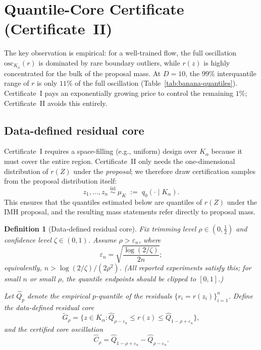 \documentclass[12pt]{article}
\newtheorem{definition}[theorem]{Definition}
\newcommand{\osc}{\mathrm{osc}}
\begin{document}
\section{Quantile-Core Certificate (Certificate~II)}\label{sec:quantile}

The key observation is empirical: for a well-trained flow, the full oscillation $\osc_{K_\alpha}(r)$ is dominated by rare boundary outliers, while $r(z)$ is highly concentrated for the bulk of the proposal mass.
At $D = 10$, the $99\%$ interquantile range of $r$ is only $11\%$ of the full oscillation (Table~\ref{tab:banana-quantiles}).
Certificate~I pays an exponentially growing price to control the remaining $1\%$; Certificate~II avoids this entirely.

\subsection{Data-defined residual core}

Certificate~I requires a space-filling (e.g., uniform) design over $K_\alpha$ because it must cover the entire region.
Certificate~II only needs the one-dimensional distribution of $r(Z)$ under the \emph{proposal}; we therefore draw certification samples from the proposal distribution itself:
\begin{equation}\label{eq:cert-sampling}
  z_1, \dots, z_n \;\overset{\mathrm{iid}}{\sim}\; \mu_K \;:=\; q_0(\cdot \mid K_\alpha).
\end{equation}
This ensures that the quantiles estimated below are quantiles of $r(Z)$ under the IMH proposal, and the resulting mass statements refer directly to proposal mass.

\begin{definition}[Data-defined residual core]\label{def:core}
Fix trimming level $\rho \in (0, \tfrac{1}{2})$ and confidence level $\zeta \in (0,1)$.
Assume $\rho > \varepsilon_n$, where
\begin{equation}\label{eq:dkw-eps}
  \varepsilon_n = \sqrt{\frac{\log(2/\zeta)}{2n}};
\end{equation}
equivalently, $n > \log(2/\zeta)/(2\rho^2)$.
(All reported experiments satisfy this; for small $n$ or small $\rho$, the quantile endpoints should be clipped to $[0,1]$.)

Let $\hat{Q}_p$ denote the empirical $p$-quantile of the residuals $\{r_i = r(z_i)\}_{i=1}^n$.
Define the \emph{data-defined residual core}
\begin{equation}\label{eq:core-data}
  \tilde{G}_\rho = \bigl\{z \in K_\alpha : \hat{Q}_{\rho - \varepsilon_n} \le r(z) \le \hat{Q}_{1-\rho+\varepsilon_n}\bigr\},
\end{equation}
and the \emph{certified core oscillation}
\begin{equation}\label{eq:chat}
  \hat{C}_\rho = \hat{Q}_{1-\rho+\varepsilon_n} - \hat{Q}_{\rho - \varepsilon_n}.
\end{equation}
\end{definition}
\end{document}
